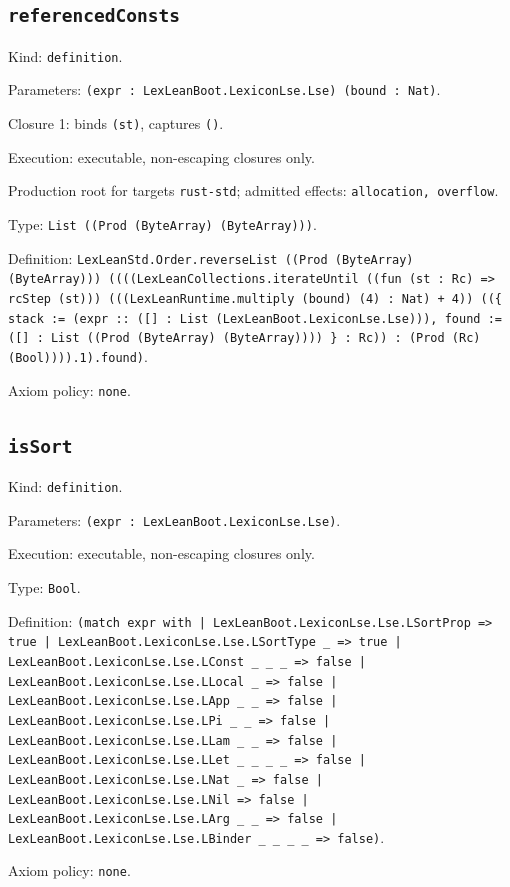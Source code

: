 \documentclass[11pt]{article}
\begin{document}
\subsection*{\texttt{referencedConsts}}
\noindent Kind: \texttt{definition}.\par
\noindent Parameters: \texttt{(expr : LexLeanBoot.LexiconLse.Lse) (bound : Nat)}.\par
\noindent Closure 1: binds \texttt{(st)}, captures \texttt{()}.\par
\noindent Execution: executable, non-escaping closures only.\par
\noindent Production root for targets \texttt{rust-std}; admitted effects: \texttt{allocation, overflow}.\par
\noindent Type: \texttt{List ((Prod (ByteArray) (ByteArray)))}.\par
\noindent Definition: \texttt{LexLeanStd.Order.reverseList ((Prod (ByteArray) (ByteArray))) ((((LexLeanCollections.iterateUntil ((fun (st : Rc) => rcStep (st))) (((LexLeanRuntime.multiply (bound) (4) : Nat) + 4)) ((\{ stack := (expr :: ([] : List (LexLeanBoot.LexiconLse.Lse))), found := ([] : List ((Prod (ByteArray) (ByteArray)))) \} : Rc)) : (Prod (Rc) (Bool)))).1).found)}.\par
\noindent Axiom policy: \texttt{none}.\par
\subsection*{\texttt{isSort}}
\noindent Kind: \texttt{definition}.\par
\noindent Parameters: \texttt{(expr : LexLeanBoot.LexiconLse.Lse)}.\par
\noindent Execution: executable, non-escaping closures only.\par
\noindent Type: \texttt{Bool}.\par
\noindent Definition: \texttt{(match expr with | LexLeanBoot.LexiconLse.Lse.LSortProp => true | LexLeanBoot.LexiconLse.Lse.LSortType \_ => true | LexLeanBoot.LexiconLse.Lse.LConst \_ \_ \_ => false | LexLeanBoot.LexiconLse.Lse.LLocal \_ => false | LexLeanBoot.LexiconLse.Lse.LApp \_ \_ => false | LexLeanBoot.LexiconLse.Lse.LPi \_ \_ => false | LexLeanBoot.LexiconLse.Lse.LLam \_ \_ => false | LexLeanBoot.LexiconLse.Lse.LLet \_ \_ \_ \_ => false | LexLeanBoot.LexiconLse.Lse.LNat \_ => false | LexLeanBoot.LexiconLse.Lse.LNil => false | LexLeanBoot.LexiconLse.Lse.LArg \_ \_ => false | LexLeanBoot.LexiconLse.Lse.LBinder \_ \_ \_ \_ => false)}.\par
\noindent Axiom policy: \texttt{none}.\par
\end{document}

